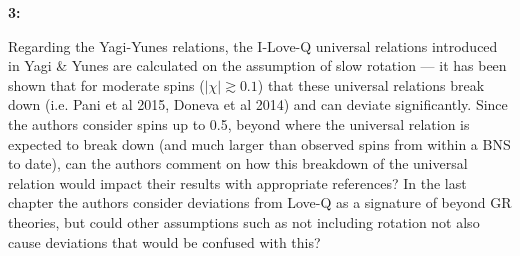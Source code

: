 \documentclass[11pt]{article}
\newenvironment{reviewercomment}[1]{
    \vspace{1em}
    \noindent \textbf{#1:} \itshape
}{
    \par\vspace{0.5em}
}
\begin{document}
\begin{reviewercomment}{3}
    Regarding the Yagi-Yunes relations, the I-Love-Q universal relations introduced in Yagi \& Yunes are calculated on the assumption of slow rotation --- it has been shown that for moderate spins ($|\chi|\gtrsim 0.1$) that these universal relations break down (i.e. Pani et al 2015, Doneva et al 2014) and can deviate significantly. Since the authors consider spins up to 0.5, beyond where the universal relation is expected to break down (and much larger than observed spins from within a BNS to date), can the authors comment on how this breakdown of the universal relation would impact their results with appropriate references? In the last chapter the authors consider deviations from Love-Q as a signature of beyond GR theories, but could other assumptions such as not including rotation not also cause deviations that would be confused with this?
\end{reviewercomment}
\end{document}
